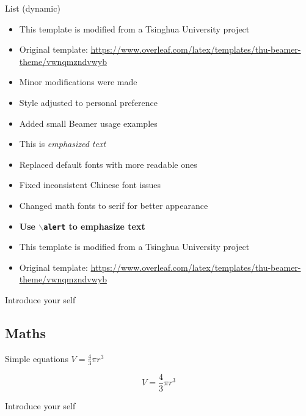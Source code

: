 \documentclass[aspectratio=169]{beamer}
\renewcommand{\alert}[1]{\textbf{\color{swufe}#1}}
\def\cmd#1{\texttt{\color[RGB]{0, 0, 139}\footnotesize $\backslash$#1}}
\begin{document}
        \begin{frame}[allowframebreaks]{List (dynamic)}
            \begin{itemize}
                \setlength{\itemsep}{10pt}
                \item This template is modified from a Tsinghua University project
                \item Original template: \url{https://www.overleaf.com/latex/templates/thu-beamer-theme/vwnqmzndvwyb}
                \item Minor modifications were made
                \item Style adjusted to personal preference
                \item Added small Beamer usage examples
                \item This is \emph{emphasized text}
                \item Replaced default fonts with more readable ones
                \item Fixed inconsistent Chinese font issues
                \item Changed math fonts to serif for better appearance
                \item \alert{Use \cmd{alert} to emphasize text}
                \item This template is modified from a Tsinghua University project
                \item Original template: \url{https://www.overleaf.com/latex/templates/thu-beamer-theme/vwnqmzndvwyb}
            \end{itemize}

            \begin{note}
                {Introduce your self}
            \end{note}
        \end{frame}

    \subsection{Maths}
        \begin{frame}{Simple equations}
            $V = \frac{4}{3} \pi r^3$

            \[
                V = \frac{4}{3} \pi r^3
            \]

            \begin{note}
                {Introduce your self}
            \end{note}
        \end{frame}
\end{document}
